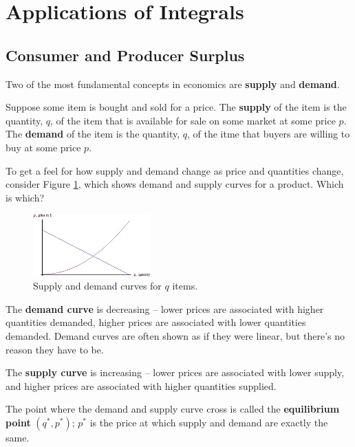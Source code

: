 \section{Applications of Integrals}
\label{sec:integral-applications}


\subsection{Consumer and Producer Surplus}
Two of the most fundamental concepts in economics are {\bf supply} and {\bf demand}.
\begin{definition}
Suppose some item is bought and sold for a price. The {\bf supply} of the item is the quantity, $q$, of the item that is available for sale on some market at some price $p$. The {\bf demand} of the item is the quantity, $q$, of the itme that buyers are willing to buy at some price $p$.
\end{definition}
To get a feel for how supply and demand change as price and quantities change, consider Figure \ref{fig:5-8-supplyDemand}, which shows demand and supply curves for a product. Which is which?

\begin{figure}[!ht]
  \centering
    \includegraphics[width=0.4\textwidth]{img/chap5/image062.png}
    \caption{Supply and demand curves for $q$ items.}
    \label{fig:5-8-supplyDemand}
\end{figure}
The {\bf demand curve} is decreasing -- lower prices are associated with higher quantities demanded, higher prices are associated with lower quantities demanded. Demand curves are often shown as if they were linear, but there's no reason they have to be.

The {\bf supply curve} is increasing -- lower prices are associated with lower supply, and higher prices are associated with higher quantities supplied.

The point where the demand and supply curve cross is called the {\bf equilibrium point} $(q^{*},p^{*})$; $p^{*}$ is the price at which supply and demand are exactly the same.

